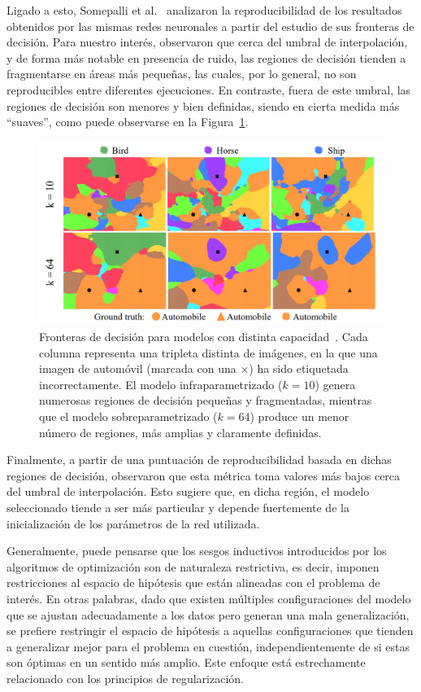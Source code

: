 Ligado a esto, Somepalli et al.~\cite{Somepalli2022} analizaron la reproducibilidad de los resultados obtenidos por las mismas redes neuronales a partir del estudio de sus fronteras de decisión. Para nuestro interés, observaron que cerca del umbral de interpolación, y de forma más notable en presencia de ruido, las regiones de decisión tienden a fragmentarse en áreas más pequeñas, las cuales, por lo general, no son reproducibles entre diferentes ejecuciones. En contraste, fuera de este umbral, las regiones de decisión son menores y bien definidas, siendo en cierta medida más ``suaves'', como puede observarse en la Figura~\ref{fig:ground-truth-reproducibility}.\newline

\begin{figure}[h]
    \centering
    \includegraphics[width=0.6\linewidth]{img/ground-truth-reproducibility.png}
    \caption[Fronteras de decisión para modelos con distinta capacidad~\cite{Somepalli2022}.]{Fronteras de decisión para modelos con distinta capacidad~\cite{Somepalli2022}. Cada columna representa una tripleta distinta de imágenes, en la que una imagen de automóvil (marcada con una $\times$) ha sido etiquetada incorrectamente. El modelo infraparametrizado ($k=10$) genera numerosas regiones de decisión pequeñas y fragmentadas, mientras que el modelo sobreparametrizado ($k=64$) produce un menor número de regiones, más amplias y claramente definidas.}\label{fig:ground-truth-reproducibility}
\end{figure}

Finalmente, a partir de una puntuación de reproducibilidad basada en dichas regiones de decisión, observaron que esta métrica toma valores más bajos cerca del umbral de interpolación. Esto sugiere que, en dicha región, el modelo seleccionado tiende a ser más particular y depende fuertemente de la inicialización de los parámetros de la red utilizada.\newline

Generalmente, puede pensarse que los sesgos inductivos introducidos por los algoritmos de optimización son de naturaleza restrictiva, es decir, imponen restricciones al espacio de hipótesis que están alineadas con el problema de interés. En otras palabras, dado que existen múltiples configuraciones del modelo que se ajustan adecuadamente a los datos pero generan una mala generalización, se prefiere restringir el espacio de hipótesis a aquellas configuraciones que tienden a generalizar mejor para el problema en cuestión, independientemente de si estas son óptimas en un sentido más amplio. Este enfoque está estrechamente relacionado con los principios de regularización.\newline


